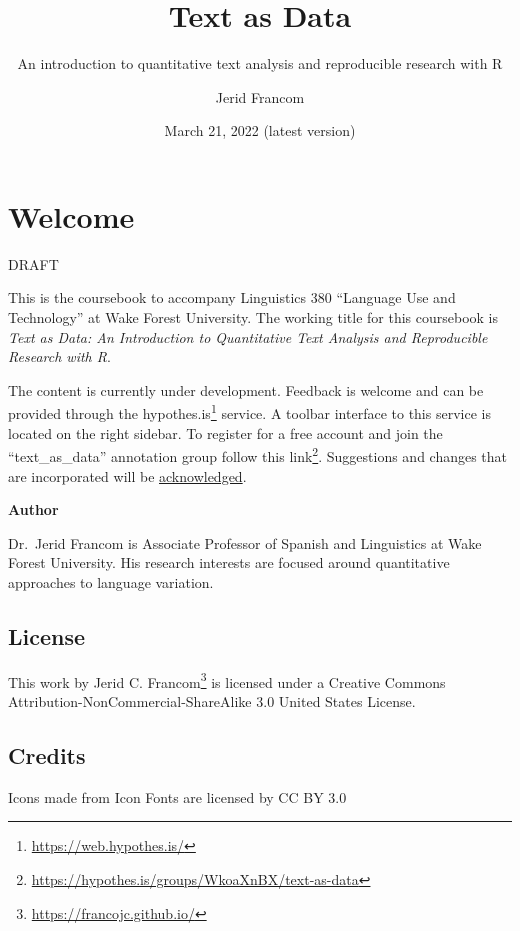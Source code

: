 \documentclass[
]{article}
\title{Text as Data}
\subtitle{An introduction to quantitative text analysis and reproducible research with R}
\author{Jerid Francom}
\date{March 21, 2022 (latest version)}
\DeclareRobustCommand{\href}[2]{#2\footnote{\url{#1}}}
\begin{document}
\maketitle

{
\setcounter{tocdepth}{2}
\tableofcontents
}
\hypertarget{welcome}{%
\section*{Welcome}\label{welcome}}

DRAFT

This is the coursebook to accompany Linguistics 380 ``Language Use and Technology'' at Wake Forest University. The working title for this coursebook is \emph{Text as Data: An Introduction to Quantitative Text Analysis and Reproducible Research with R}.

The content is currently under development. Feedback is welcome and can be provided through the \href{https://web.hypothes.is/}{hypothes.is} service. A toolbar interface to this service is located on the right sidebar. To register for a free account and join the ``text\_as\_data'' annotation group \href{https://hypothes.is/groups/WkoaXnBX/text-as-data}{follow this link}. Suggestions and changes that are incorporated will be \protect\hyperlink{acknowledgements}{acknowledged}.

\textbf{Author}

Dr.~Jerid Francom is Associate Professor of Spanish and Linguistics at Wake Forest University. His research interests are focused around quantitative approaches to language variation.

\hypertarget{license}{%
\subsection*{License}\label{license}}

This work by \href{https://francojc.github.io/}{Jerid C. Francom} is licensed under a Creative Commons Attribution-NonCommercial-ShareAlike 3.0 United States License.

\hypertarget{credits}{%
\subsection*{Credits}\label{credits}}

Icons made from Icon Fonts are licensed by CC BY 3.0
\end{document}
